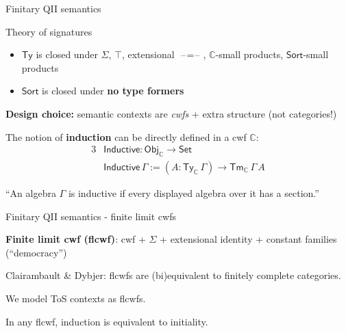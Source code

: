\documentclass[dvipsnames]{beamer}
\newcommand{\ms}[1]{\mathsf{#1}}
\newcommand{\mbb}[1]{\mathbb{#1}}
\newcommand{\Tm}{\mathsf{Tm}}
\newcommand{\Ty}{\mathsf{Ty}}
\newcommand{\blank}{\mathord{\hspace{1pt}\text{--}\hspace{1pt}}}
\newcommand{\Set}{\mathsf{Set}}
\newcommand{\Sort}{\mathsf{Sort}}
\newcommand{\mbbC}{\mbb{C}}
\begin{document}
\begin{frame}{Finitary QII semantics}

\begin{block}{Theory of signatures}
\begin{itemize}
\item $\Ty$ is closed under $\Sigma$, $\top$, extensional $\blank=\blank$, $\mbbC$-small products,
  $\Sort$-small products
\item $\Sort$ is closed under \textbf{no type formers}
\end{itemize}
\end{block}

\textbf{Design choice:} semantic contexts are \emph{cwfs} + extra structure (not categories!)
\vspace{1em}

The notion of \textbf{induction} can be directly defined in a cwf $\mbbC$:
\begin{alignat*}{3}
  & \ms{Inductive} : \ms{Obj}_\mbbC \to \Set \\
  & \ms{Inductive}\,\Gamma := (A : \Ty_\mbbC\,\Gamma) \to \Tm_\mbbC\,\Gamma\,A
\end{alignat*}

``An algebra $\Gamma$ is inductive if every displayed algebra over it has a section.''

\end{frame}

\begin{frame}{Finitary QII semantics - finite limit cwfs}

\begin{definition}{}
\textbf{Finite limit cwf (flcwf)}: cwf + $\Sigma$ + extensional identity + constant families (``democracy'')
\end{definition}
\vspace{1em}

Clairambault \& Dybjer: flcwfs are (bi)equivalent to finitely complete categories.
\vspace{1em}

We model ToS contexts as flcwfs.

\begin{theorem}
In any flcwf, induction is equivalent to initiality.
\end{theorem}

\end{frame}
\end{document}
